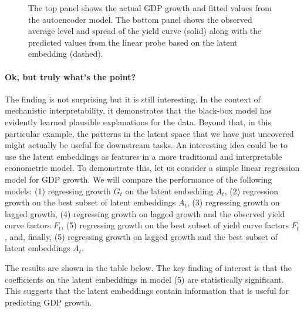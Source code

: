 \documentclass[
  letterpaper,
  DIV=11,
  numbers=noendperiod]{scrartcl}
\let\oldparagraph\paragraph
\renewcommand{\paragraph}[1]{\oldparagraph{#1}\mbox{}}
\theoremstyle{plain}
\theoremstyle{remark}
\begin{document}
\begin{figure}


\caption{\label{fig-dl-results}The top panel shows the actual GDP growth
and fitted values from the autoencoder model. The bottom panel shows the
observed average level and spread of the yield curve (solid) along with
the predicted values from the linear probe based on the latent embedding
(dashed).}

\end{figure}%

\paragraph{Ok, but truly what's the
point?}\label{ok-but-truly-whats-the-point}

The finding is not surprising but it is still interesting. In the
context of mechanistic interpretability, it demonstrates that the
black-box model has evidently learned plausible explanations for the
data. Beyond that, in this particular example, the patterns in the
latent space that we have just uncovered might actually be useful for
downstream tasks. An interesting idea could be to use the latent
embeddings as features in a more traditional and interpretable
econometric model. To demonstrate this, let us consider a simple linear
regression model for GDP growth. We will compare the performance of the
following models: (1) regressing growth \(G_t\) on the latent embedding
\(A_t\), (2) regression growth on the best subset of latent embeddings
\(A_t\), (3) regressing growth on lagged growth, (4) regressing growth
on lagged growth and the observed yield curve factors \(F_t\), (5)
regressing growth on the best subset of yield curve factors \(F_t\),
and, finally, (5) regressing growth on lagged growth and the best subset
of latent embeddings \(A_t\).

The results are shown in the table below. The key finding of interest is
that the coefficients on the latent embeddings in model (5) are
statistically significant. This suggests that the latent embeddings
contain information that is useful for predicting GDP growth.
\end{document}
